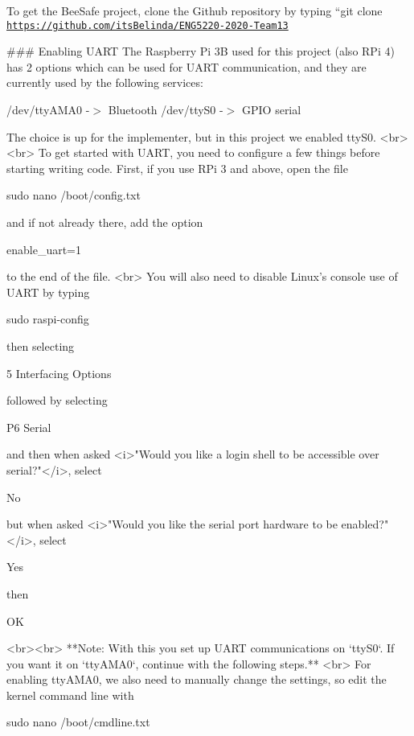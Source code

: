 To get the Bee\+Safe project, clone the Github repository by typing ``{\ttfamily  git clone \href{https://github.com/itsBelinda/ENG5220-2020-Team13}{\tt https\+://github.\+com/its\+Belinda/\+E\+N\+G5220-\/2020-\/\+Team13}} 
\begin{DoxyCode}
### Enabling UART
The Raspberry Pi 3B used for this project (also RPi 4) has 2 options which can be used for UART
       communication, and they are currently used by the following services:
\end{DoxyCode}
 /dev/tty\+A\+M\+A0 -\/$>$ Bluetooth /dev/tty\+S0 -\/$>$ G\+P\+IO serial 
\begin{DoxyCode}
The choice is up for the implementer, but in this project we enabled ttyS0.
<br><br>
To get started with UART, you need to configure a few things before starting writing code. First, if you
       use RPi 3 and above, open the file
\end{DoxyCode}
 sudo nano /boot/config.txt 
\begin{DoxyCode}
and if not already there, add the option
\end{DoxyCode}
 enable\+\_\+uart=1 
\begin{DoxyCode}
to the end of the file.
<br>
You will also need to disable Linux's console use of UART by typing
\end{DoxyCode}
 sudo raspi-\/config 
\begin{DoxyCode}
then selecting
\end{DoxyCode}
 5 Interfacing Options 
\begin{DoxyCode}
followed by selecting
\end{DoxyCode}
 P6 Serial 
\begin{DoxyCode}
and then when asked <i>"Would you like a login shell to be accessible over serial?"</i>, select
\end{DoxyCode}
 No 
\begin{DoxyCode}
but when asked <i>"Would you like the serial port hardware to be enabled?"</i>, select
\end{DoxyCode}
 Yes 
\begin{DoxyCode}
then
\end{DoxyCode}
 OK 
\begin{DoxyCode}
<br><br>
**Note: With this you set up UART communications on `ttyS0`. If you want it on `ttyAMA0`, continue with the
       following steps.**
<br> 
For enabling ttyAMA0, we also need to manually change the settings, so edit the kernel command line with
\end{DoxyCode}
 sudo nano /boot/cmdline.txt 
